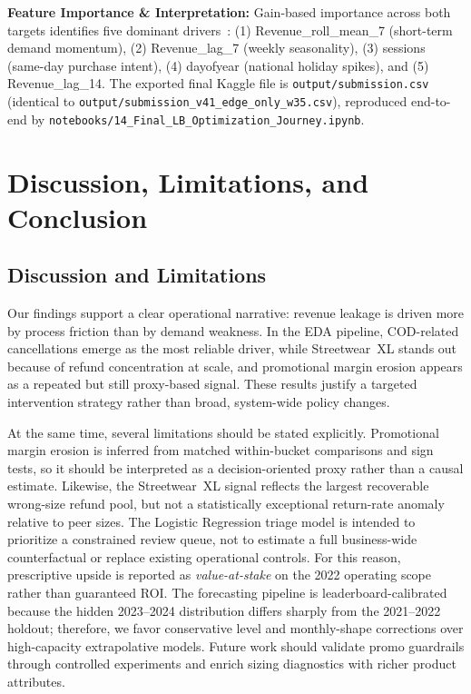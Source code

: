 \documentclass[10pt]{article}
\begin{document}
\textbf{Feature Importance \& Interpretation:} Gain-based importance across both targets identifies five dominant drivers~\cite{lundberg2017shap}: (1) Revenue\_roll\_mean\_7 (short-term demand momentum), (2) Revenue\_lag\_7 (weekly seasonality), (3) sessions (same-day purchase intent), (4) dayofyear (national holiday spikes), and (5) Revenue\_lag\_14. The exported final Kaggle file is \texttt{output/submission.csv} (identical to \texttt{output/submission\_v41\_edge\_only\_w35.csv}), reproduced end-to-end by \texttt{notebooks/14\_Final\_LB\_Optimization\_Journey.ipynb}.

\section{Discussion, Limitations, and Conclusion}
\label{sec:conclusion}

\subsection{Discussion and Limitations}
Our findings support a clear operational narrative: revenue leakage is driven more by process friction than by demand weakness. In the EDA pipeline, COD-related cancellations emerge as the most reliable driver, while Streetwear~XL stands out because of refund concentration at scale, and promotional margin erosion appears as a repeated but still proxy-based signal. These results justify a targeted intervention strategy rather than broad, system-wide policy changes.

At the same time, several limitations should be stated explicitly. Promotional margin erosion is inferred from matched within-bucket comparisons and sign tests, so it should be interpreted as a decision-oriented proxy rather than a causal estimate. Likewise, the Streetwear~XL signal reflects the largest recoverable wrong-size refund pool, but not a statistically exceptional return-rate anomaly relative to peer sizes. The Logistic Regression triage model is intended to prioritize a constrained review queue, not to estimate a full business-wide counterfactual or replace existing operational controls. For this reason, prescriptive upside is reported as \emph{value-at-stake} on the 2022 operating scope rather than guaranteed ROI. The forecasting pipeline is leaderboard-calibrated because the hidden 2023--2024 distribution differs sharply from the 2021--2022 holdout; therefore, we favor conservative level and monthly-shape corrections over high-capacity extrapolative models. Future work should validate promo guardrails through controlled experiments and enrich sizing diagnostics with richer product attributes.
\end{document}
